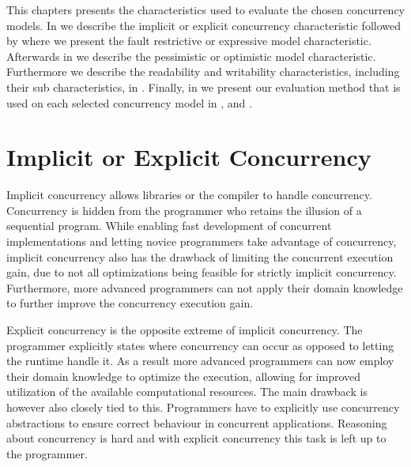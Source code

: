  \makeatletter {}\makeatother
{}
This chapters presents the characteristics used to evaluate the chosen concurrency models. In  we describe the implicit or explicit concurrency characteristic followed by  where we present the fault restrictive or expressive model characteristic. Afterwards in  we describe the pessimistic or optimistic model characteristic. Furthermore we describe the readability and writability characteristics, including their sub characteristics, in . Finally, in  we present our evaluation method that is used on each selected concurrency model in ,  and .

\label{chap:char}
\section{Implicit or Explicit Concurrency}\label{sec:char_implicit_explicit}
Implicit concurrency allows libraries or the compiler to handle concurrency. Concurrency is hidden from the programmer who retains the illusion of a sequential program\cite[p. 59]{sutter2005software}. While enabling fast development of concurrent implementations and letting novice programmers take advantage of concurrency, implicit concurrency also has the drawback of limiting the concurrent execution gain, due to not all optimizations being feasible for strictly implicit concurrency. Furthermore, more advanced programmers can not apply their domain knowledge to further improve the concurrency execution gain.

Explicit concurrency is the opposite extreme of implicit concurrency. The programmer explicitly states where concurrency can occur as opposed to letting the runtime handle it\cite[p. 59]{sutter2005software}. As a result more advanced programmers can now employ their domain knowledge to optimize the execution, allowing for improved utilization of the available computational resources. The main drawback is however also closely tied to this. Programmers have to explicitly use concurrency abstractions to ensure correct behaviour in concurrent applications. Reasoning about concurrency is hard\cite[p. 56]{sutter2005software} and with explicit concurrency this task is left up to the programmer.

